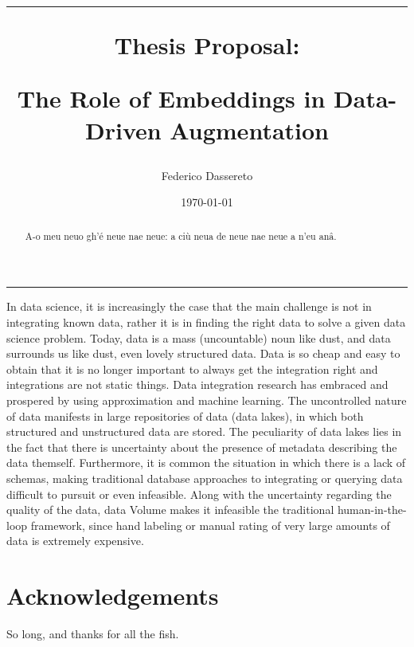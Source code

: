 \documentclass[a4paper,11pt, english]{article}
\title{\vspace{0cm}
\hrule
\vspace{1cm}
\centerline{\LARGE{Thesis Proposal:}}
\vspace{0.5cm}
\centerline{\LARGE {\bf The Role of Embeddings in Data-Driven Augmentation}}
}
\author{Federico Dassereto}
\date{\today}
\begin{document}
\maketitle
\hrule 
\vspace{1cm}

\begin{abstract}
    A-o meu neuo gh'é neue nae neue: a ciù neua de neue nae neue a n'eu anâ.
\end{abstract}


In data science, it is increasingly the case that the main challenge is not in integrating known data, rather it is in finding the right data to solve a given data science problem. Today, data is a mass (uncountable) noun like dust, and data surrounds us like dust, even lovely structured data. Data is so cheap and easy to obtain that it is no longer important to always get the integration right and integrations are not static things. Data integration research has embraced and prospered by using approximation and machine learning. The uncontrolled nature of data manifests in large repositories of data (data lakes), in which both structured and unstructured data are stored. The peculiarity of data lakes lies in the fact that there is uncertainty about the presence of metadata describing the data themself. Furthermore, it is common the situation in which there is a lack of schemas, making traditional database approaches to integrating or querying data difficult to pursuit or even infeasible. Along with the uncertainty regarding the quality of the data, data Volume makes it infeasible the traditional human-in-the-loop framework, since hand labeling or manual rating of very large amounts of data is extremely expensive.









\section*{Acknowledgements}{So long, and thanks for all the fish.}



\printbibliography
\end{document}
